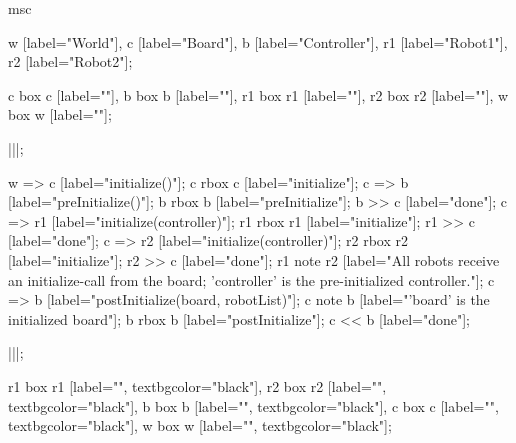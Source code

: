 \begin{msc}
msc
{

w [label="World"],
c [label="Board"],
b [label="Controller"],
r1 [label="Robot1"],
r2 [label="Robot2"];

c box c [label=""],
b box b [label=""],
r1 box r1 [label=""],
r2 box r2 [label=""],
w box w [label=""];

|||;

w => c [label="initialize()"];
c rbox c [label="initialize"];
c => b [label="preInitialize()"];
b rbox b [label="preInitialize"];
b >> c [label="done"];
c => r1 [label="initialize(controller)"];
r1 rbox r1 [label="initialize"];
r1 >> c [label="done"];
c => r2 [label="initialize(controller)"];
r2 rbox r2 [label="initialize"];
r2 >> c [label="done"];
r1 note r2 [label="All robots receive an initialize-call from the board; 'controller' is the pre-initialized controller."];
c => b [label="postInitialize(board, robotList)"];
c note b [label="'board' is the initialized board"];
b rbox b [label="postInitialize"];
c << b [label="done"];

|||;

r1 box r1 [label="", textbgcolor="black"],
r2 box r2 [label="", textbgcolor="black"],
b box b [label="", textbgcolor="black"],
c box c [label="", textbgcolor="black"],
w box w [label="", textbgcolor="black"];

}
\end{msc}

